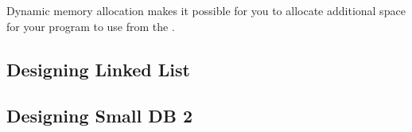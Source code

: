 Dynamic memory allocation makes it possible for you to allocate additional space for your program to use from the .

\subsection{Designing Linked List} %
\label{sub:designing_linked_list}


\subsection{Designing Small DB 2} %
\label{sub:designing_small_db_2}

